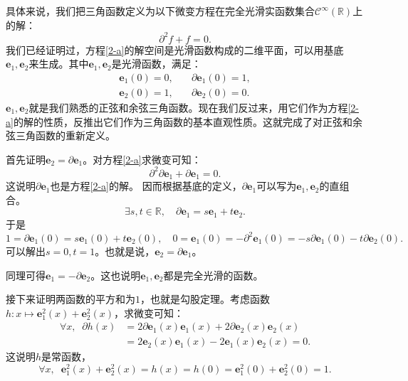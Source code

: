 \documentclass[12pt,UTF8]{ctexbook}
\begin{document}
\begin{appendix}
具体来说，我们把三角函数定义为以下微变方程在完全光滑实函数集合$\mathcal{C}^{\infty}(\mathbb{R})$上的解：
\begin{equation}
    \partial^2 f + f = 0. \label{2-a}
\end{equation}
我们已经证明过，方程\eqref{2-a}的解空间是光滑函数构成的二维平面，可以用基底$\mathbf{e}_1, \mathbf{e}_2$来生成。其中$\mathbf{e}_1, \mathbf{e}_2$是光滑函数，满足：
$$
\begin{array}{ll}
    \mathbf{e}_1(0) = 0, &\quad \partial \mathbf{e}_1(0) = 1, \\
    \mathbf{e}_2(0) = 1, &\quad \partial \mathbf{e}_2(0) = 0.
\end{array}
$$
$\mathbf{e}_1, \mathbf{e}_2$就是我们熟悉的正弦和余弦三角函数。现在我们反过来，用它们作为方程\eqref{2-a}的解的性质，反推出它们作为三角函数的基本直观性质。这就完成了对正弦和余弦三角函数的重新定义。

首先证明$\mathbf{e}_2 = \partial \mathbf{e}_1$。对方程\eqref{2-a}求微变可知：
$$ \partial^2 \partial \mathbf{e}_1 + \partial \mathbf{e}_1 = 0. $$
这说明$\partial \mathbf{e}_1$也是方程\eqref{2-a}的解。
因而根据基底的定义，$\partial \mathbf{e}_1$可以写为$\mathbf{e}_1, \mathbf{e}_2$的直组合。
$$ \exists s, t \in \mathbb{R}, \quad \partial \mathbf{e}_1 = s\mathbf{e}_1 + t\mathbf{e}_2. $$
于是
$$ 1 = \partial \mathbf{e}_1(0) = s\mathbf{e}_1(0) + t\mathbf{e}_2(0), \quad 0 = \mathbf{e}_1(0) = -\partial^2 \mathbf{e}_1(0) = -s\partial \mathbf{e}_1(0) - t\partial \mathbf{e}_2(0). $$
可以解出$s = 0, t = 1$。也就是说，$\mathbf{e}_2 = \partial \mathbf{e}_1$。

同理可得$\mathbf{e}_1 = -\partial \mathbf{e}_2$。这也说明$\mathbf{e}_1, \mathbf{e}_2$都是完全光滑的函数。

接下来证明两函数的平方和为$1$，也就是勾股定理。考虑函数$h: x\mapsto \mathbf{e}_1^2(x) + \mathbf{e}_2^2(x)$，求微变可知：
\begin{align*}
    \forall x, \;\; \partial h(x) &= 2 \partial \mathbf{e}_1(x)\mathbf{e}_1(x) + 2\partial \mathbf{e}_2(x)\mathbf{e}_2(x) \\
    &= 2 \mathbf{e}_2(x)\mathbf{e}_1(x) - 2 \mathbf{e}_1(x)\mathbf{e}_2(x) = 0.
\end{align*}
这说明$h$是常函数，
$$\forall x, \;\; \mathbf{e}_1^2(x) + \mathbf{e}_2^2(x) = h(x) = h(0) = \mathbf{e}_1^2(0) + \mathbf{e}_2^2(0) = 1. $$


\end{appendix}
\end{document}
